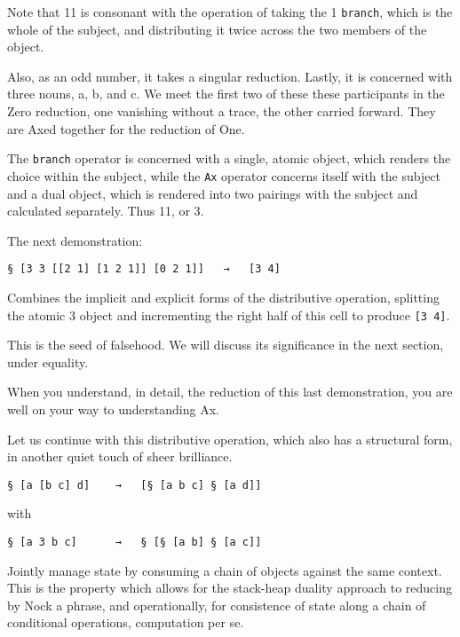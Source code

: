 \documentclass[twoside]{article}
\begin{document}
Note that 11 is consonant with the operation of taking the 1 \texttt{branch}, which is the whole of the subject, and distributing it twice across the two members of the object.

Also, as an odd number, it takes a singular reduction. Lastly, it is concerned with three nouns, a, b, and c. We meet the first two of these these participants in the Zero reduction, one vanishing without a trace, the other carried forward. They are Axed together for the reduction of One.

The \texttt{branch} operator is concerned with a single, atomic object, which renders the choice within the subject, while the \texttt{Ax} operator concerns itself with the subject and a dual object, which is rendered into two pairings with the subject and calculated separately. Thus 11, or 3.

The next demonstration:

\begin{lstlisting}[style=listingblock]
§ [3 3 [[2 1] [1 2 1]] [0 2 1]]   →   [3 4]
\end{lstlisting}

Combines the implicit and explicit forms of the distributive operation, splitting the atomic 3 object and incrementing the right half of this cell to produce \lstinline[style=inlinecode]{[3 4]}.

This is the seed of falsehood.  We will discuss its significance in the next section, under equality.

When you understand, in detail, the reduction of this last demonstration, you are well on your way to understanding Ax.

Let us continue with this distributive operation, which also has a structural form, in another quiet touch of sheer brilliance.

\begin{lstlisting}[style=listingblock]
§ [a [b c] d]    →   [§ [a b c] § [a d]]
\end{lstlisting}

with

\begin{lstlisting}[style=listingblock]
§ [a 3 b c]      →   § [§ [a b] § [a c]]
\end{lstlisting}

Jointly manage state by consuming a chain of objects against the same context. This is the property which allows for the stack-heap duality approach to reducing by Nock a phrase, and operationally, for consistence of state along a chain of conditional operations, computation per se.
\end{document}

